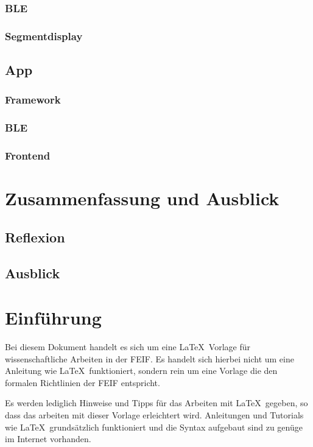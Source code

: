 \subsubsection{BLE\label{Kap.:BLE}}
\subsubsection{Segmentdisplay}
\subsection{App}
\subsubsection{Framework}
\subsubsection{BLE}
\subsubsection{Frontend}
\section{Zusammenfassung und Ausblick \label{Kap.:Zusammenfassung}}
\subsection{Reflexion}%
\subsection{Ausblick} %

\section{Einführung}

Bei diesem Dokument handelt es sich um eine \LaTeX\ Vorlage für wissenschaftliche Arbeiten in der \ac{FEIF}. Es handelt sich hierbei nicht um eine Anleitung wie \LaTeX\ funktioniert, sondern rein um eine Vorlage die den formalen Richtlinien der \ac{FEIF} entspricht.

Es werden lediglich Hinweise und Tipps für das Arbeiten mit \LaTeX\ gegeben, so dass das arbeiten mit dieser Vorlage erleichtert wird. Anleitungen und Tutorials wie \LaTeX\ grundsätzlich funktioniert und die Syntax aufgebaut sind zu genüge im Internet vorhanden.

